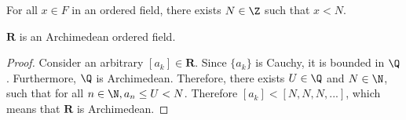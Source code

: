 \documentclass[10pt]{article}
\begin{document}
\begin{definition}[Archimedean]
    For all $x \in F$ in an ordered field, there exists $ N \in \Z$ such that $x < N$.
\end{definition}
\begin{proposition}
    $\textbf{R}$ is an Archimedean ordered field.
\end{proposition}
\begin{proof}
    Consider an arbitrary $[a_k]\in \mathbf{R}$. Since $\{a_k\}$ is Cauchy, it is bounded in $\Q$. Furthermore, $\Q$ is Archimedean. Therefore, there exists $U\in\Q$ and $N\in\N$, such that for all $n\in\N, a_n\leq U<N$. Therefore $[a_k]<[N,N,N,...]$, which means that $\mathbf{R}$ is Archimedean.
\end{proof}
    
\end{document}
